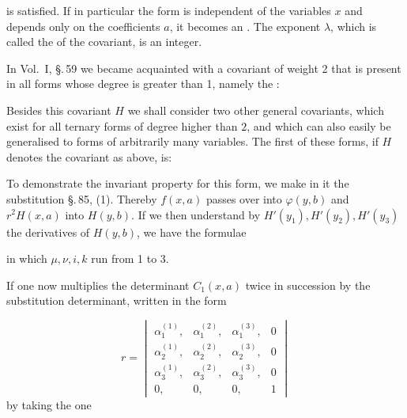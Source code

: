 is satisfied. If in particular the form is independent of the variables $x$ and depends only on the coefficients $a$, it becomes an . The exponent $\lambda$, which is called the  of the covariant, is an integer.

In Vol.\ I, \S.\,59 we became acquainted with a covariant of weight 2 that is present in all forms whose degree is greater than 1, namely the :


Besides this covariant $H$ we shall consider two other general covariants, which exist for all ternary forms of degree higher than $2$, and which can also easily be generalised to forms of arbitrarily many variables. The first of these forms, if $H$ denotes the  covariant as above, is:


To demonstrate the invariant property for this form, we make in it the substitution \S.\,85, (1). Thereby $f(x, a)$ passes over into $\varphi(y, b)$ and $r^2 H(x, a)$ into $H(y, b)$. If we then understand by $H'(y_1), H'(y_2), H'(y_3)$ the derivatives of $H(y, b)$, we have the formulae

in which $\mu, \nu, i, k$ run from 1 to 3.

If one now multiplies the determinant $C_1(x, a)$ twice in succession by the substitution determinant, written in the form

\[
r = \begin{vmatrix} \alpha_1^{(1)}, & \alpha_1^{(2)}, & \alpha_1^{(3)}, & 0 \\ \alpha_2^{(1)}, & \alpha_2^{(2)}, & \alpha_2^{(3)}, & 0 \\ \alpha_3^{(1)}, & \alpha_3^{(2)}, & \alpha_3^{(3)}, & 0 \\ 0, & 0, & 0, & 1 \end{vmatrix}
\]
by taking the one
